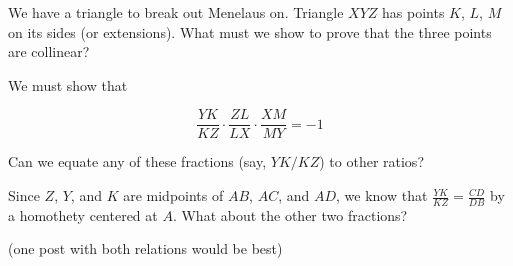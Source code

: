 
We have a triangle to break out Menelaus on.  Triangle $XYZ$ has points $K$, $L$, $M$ on its sides (or extensions).  What must we show to prove that the three points are collinear?





We must show that

$$ \frac{YK}{KZ}\cdot\frac{ZL}{LX}\cdot\frac{XM}{MY} = -1$$

Can we equate any of these fractions (say, $YK/KZ$) to other ratios?







Since $Z$, $Y$, and $K$ are midpoints of $AB$, $AC$, and $AD$, we know that $\frac{YK}{KZ} = \frac{CD}{DB}$ by a homothety centered at $A$. What about the other two fractions?

(one post with both relations would be best)

